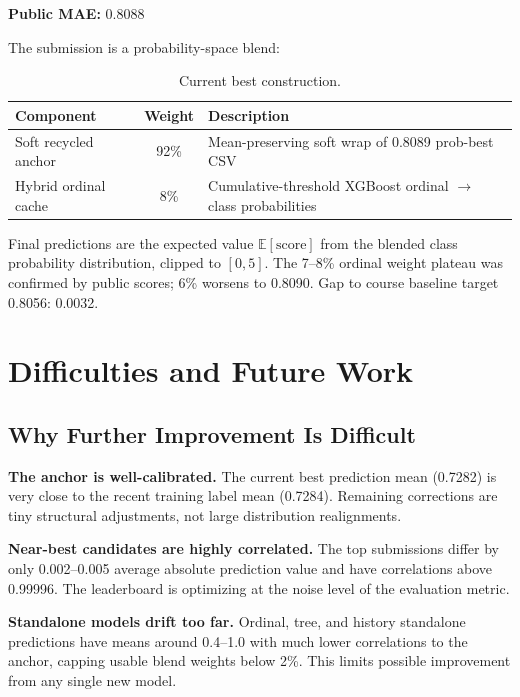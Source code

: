 \documentclass[12pt, a4paper]{article}
\begin{document}
\textbf{Public MAE:} 0.8088

The submission is a probability-space blend:

\begin{table}[H]
\centering
\caption{Current best construction.}
\label{tab:best}
\begin{tabular}{@{}lcl@{}}
\toprule
\textbf{Component} & \textbf{Weight} & \textbf{Description} \\
\midrule
Soft recycled anchor & 92\% & Mean-preserving soft wrap of 0.8089 prob-best CSV \\
Hybrid ordinal cache & 8\%  & Cumulative-threshold XGBoost ordinal $\rightarrow$ class probabilities \\
\bottomrule
\end{tabular}
\end{table}

Final predictions are the expected value $\mathbb{E}[\text{score}]$ from the blended class probability distribution, clipped to $[0, 5]$. The 7--8\% ordinal weight plateau was confirmed by public scores; 6\% worsens to 0.8090. Gap to course baseline target 0.8056: 0.0032.

\section{Difficulties and Future Work}

\subsection{Why Further Improvement Is Difficult}

\textbf{The anchor is well-calibrated.} The current best prediction mean (0.7282) is very close to the recent training label mean (0.7284). Remaining corrections are tiny structural adjustments, not large distribution realignments.

\textbf{Near-best candidates are highly correlated.} The top submissions differ by only 0.002--0.005 average absolute prediction value and have correlations above 0.99996. The leaderboard is optimizing at the noise level of the evaluation metric.

\textbf{Standalone models drift too far.} Ordinal, tree, and history standalone predictions have means around 0.4--1.0 with much lower correlations to the anchor, capping usable blend weights below 2\%. This limits possible improvement from any single new model.
\end{document}
